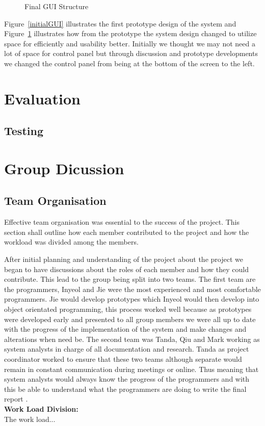 \documentclass[11pt]{article}
\begin{document}
	\begin{figure}[h]
	\caption{Final GUI Structure}
	\label{finalGUI}
	\end{figure}
	Figure~\ref{initialGUI} illustrates the first prototype design of the system and Figure~\ref{finalGUI} illustrates how from the prototype the system design changed to utilize space for efficiently and usability better. 
	Initially we thought we may not need a lot of space for control panel but through discussion and prototype developments we changed the control panel from being at the bottom of the screen to the left. 
	
	\section{Evaluation} %
	\subsection{Testing} %
	\section{Group Dicussion}
	\subsection{Team Organisation} %
	Effective team organisation was essential to the success of the project. This section shall outline how each member contributed to the project and how the workload was divided among the members. 
	
	After initial planning and understanding of the project about the project we began to have discussions about the roles of each member and how they could contribute. This lead to the group being split into two teams. The first team are the programmers, Inyeol and Jie were the most experienced and most comfortable programmers. Jie would develop prototypes which Inyeol would then develop into object orientated programming, this process worked well because as prototypes were developed early and presented to all group members we were all up to date with the progress of the implementation of the system and make changes and alterations when need be. 
	The second team was Tanda, Qiu and Mark working as system analysts in charge of all documentation and research.
	Tanda as project coordinator worked to ensure that these two teams although separate would remain in constant communication during meetings or online. Thus meaning that system analysts would always know the progress of the programmers and with this be able to understand what the programmers are doing to write the final report . \\
	\textbf{Work Load Division:}\\ 
	The work load...
	
\end{document}
